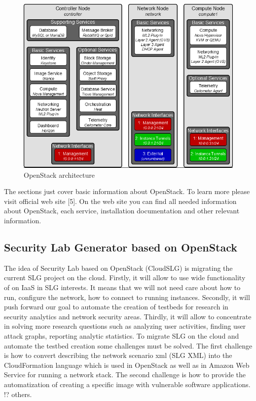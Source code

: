\begin{figure}[ht!]
\centering
\includegraphics[width=\textwidth]{openstack_architecture.png}
\caption{OpenStack architecture}
\label{overflow}
\end{figure}

The sections just cover basic information about OpenStack. To learn more please visit official web site [5]. On the web site you can find all needed information about OpenStack, each service, installation documentation and other relevant information. 


\subsection{Security Lab Generator based on OpenStack}
The idea of Security Lab based on OpenStack (CloudSLG) is migrating the current SLG project on the cloud. Firstly, it will allow to use wide functionality of on IaaS in SLG interests. It means that we will not need care about how to run, configure the network, how to connect to running instances. Secondly, it will push forward our goal to automate the creation of testbeds for research in security analytics and network security areas. Thirdly, it will allow to concentrate in solving more research questions such as analyzing user activities, finding user attack graphs, reporting analytic statistics. To migrate SLG on the cloud and automate the testbed creation some challenges must be solved. The first challenge is how to convert describing the network scenario xml (SLG XML) into the CloudFormation language which is used in OpenStack as well as in Amazon Web Service for running a network stack. The second challenge is how to provide the automatization of creating a specific image with vulnerable software applications. !? others.  



% 